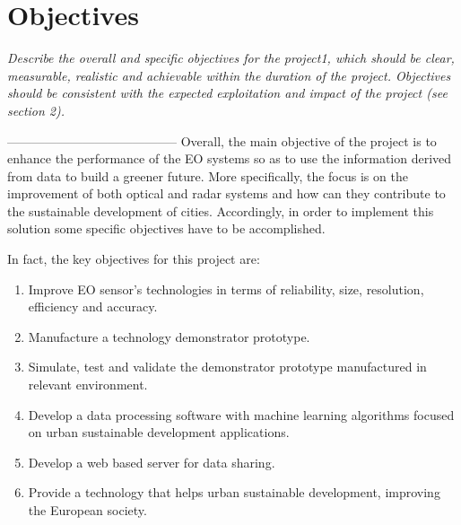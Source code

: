\section{Objectives}

\textit{Describe the overall and specific objectives for the project1, which should be clear, measurable, realistic and achievable within the duration of the project. Objectives should be consistent with the expected exploitation and impact of the project (see section 2). }

-----------------------------------------
Overall, the main objective of the project is to enhance the performance of the
EO systems so as to use the information derived from data to build a greener future. More
specifically, the focus is on the improvement of both optical and radar systems and how can
they contribute to the sustainable development of cities. Accordingly, in order to implement this solution some specific objectives have to be accomplished.

In fact, the key objectives for this project are:

\begin{enumerate}

	\item Improve EO sensor's technologies in terms of reliability, size, resolution, efficiency and accuracy.

	\item Manufacture a technology demonstrator prototype.

	\item Simulate, test and validate the demonstrator prototype manufactured in relevant environment.

	\item Develop a data processing software with machine learning algorithms focused on urban sustainable development applications. 

	\item Develop a web based server for data sharing. 

	\item Provide a technology that helps urban sustainable development, improving the European society.
 
\end{enumerate}